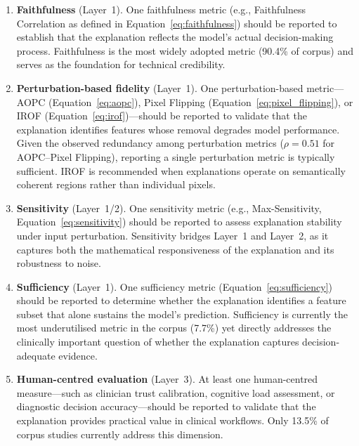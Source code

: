 \begin{enumerate}
    \item \textbf{Faithfulness} (Layer~1). One faithfulness metric (e.g.,
    Faithfulness Correlation as defined in Equation~\ref{eq:faithfulness})
    should be reported to establish that the explanation reflects the model's
    actual decision-making process. Faithfulness is the most widely adopted
    metric (90.4\% of corpus) and serves as the foundation for technical
    credibility.

    \item \textbf{Perturbation-based fidelity} (Layer~1). One
    perturbation-based metric---AOPC (Equation~\ref{eq:aopc}), Pixel Flipping
    (Equation~\ref{eq:pixel_flipping}), or IROF
    (Equation~\ref{eq:irof})---should be reported to validate that the
    explanation identifies features whose removal degrades model performance.
    Given the observed redundancy among perturbation metrics ($\rho = 0.51$
    for AOPC--Pixel Flipping), reporting a single perturbation metric is
    typically sufficient. IROF is recommended when explanations operate on
    semantically coherent regions rather than individual pixels.

    \item \textbf{Sensitivity} (Layer~1/2). One sensitivity metric (e.g.,
    Max-Sensitivity, Equation~\ref{eq:sensitivity}) should be reported to
    assess explanation stability under input perturbation. Sensitivity bridges
    Layer~1 and Layer~2, as it captures both the mathematical responsiveness
    of the explanation and its robustness to noise.

    \item \textbf{Sufficiency} (Layer~1). One sufficiency metric
    (Equation~\ref{eq:sufficiency}) should be reported to determine whether
    the explanation identifies a feature subset that alone sustains the
    model's prediction. Sufficiency is currently the most underutilised metric
    in the corpus (7.7\%) yet directly addresses the clinically important
    question of whether the explanation captures decision-adequate evidence.

    \item \textbf{Human-centred evaluation} (Layer~3). At least one
    human-centred measure---such as clinician trust calibration, cognitive
    load assessment, or diagnostic decision accuracy---should be reported
    to validate that the explanation provides practical value in clinical
    workflows. Only 13.5\% of corpus studies currently address this dimension.
\end{enumerate}

